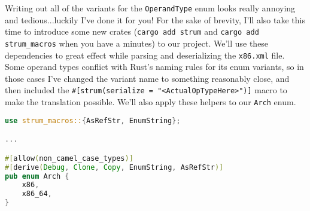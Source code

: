 Writing out all of the variants for the \texttt{OperandType} enum looks really
annoying and tedious...luckily I've done it for you! For the sake of brevity,
I'll also take this time to introduce some new crates (\texttt{cargo add strum}
and \texttt{cargo add strum\_macros} when you have a minutes) to our project. We'll
use these dependencies to great effect while parsing and deserializing the \texttt{x86.xml}
file. Some operand types conflict with Rust's naming rules for its enum variants,
so in those cases I've changed the variant name to something reasonably close,
and then included the \texttt{\#[strum(serialize = "<ActualOpTypeHere>")]} macro
to make the translation possible. We'll also apply these helpers to our
\texttt{Arch} enum.

\begin{lstlisting}[language=rust]
use strum_macros::{AsRefStr, EnumString};

...

#[allow(non_camel_case_types)]
#[derive(Debug, Clone, Copy, EnumString, AsRefStr)]
pub enum Arch {
    x86,
    x86_64,
}


\end{lstlisting}
